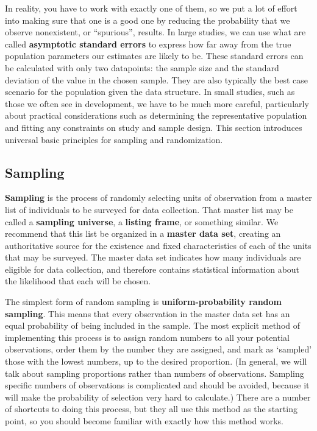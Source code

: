 In reality, you have to work with exactly one of them,
so we put a lot of effort into making sure that one is a good one
by reducing the probability that we observe nonexistent, or ``spurious'', results.
In large studies, we can use what are called \textbf{asymptotic standard errors}
to express how far away from the true population parameters our estimates are likely to be.
These standard errors can be calculated with only two datapoints:
the sample size and the standard deviation of the value in the chosen sample.
They are also typically the best case scenario for the population given the data structure.
In small studies, such as those we often see in development,
we have to be much more careful, particularly about practical considerations
such as determining the representative population
and fitting any constraints on study and sample design.
This section introduces universal basic principles for sampling and randomization.

\subsection{Sampling}

\textbf{Sampling} is the process of randomly selecting units of observation
from a master list of individuals to be surveyed for data collection.
That master list may be called a \textbf{sampling universe}, a \textbf{listing frame}, or something similar.
We recommend that this list be organized in a \textbf{master data set},
creating an authoritative source for the existence and fixed 
characteristics of each of the units that may be surveyed.
The master data set indicates how many individuals are eligible for data collection,
and therefore contains statistical information about the likelihood that each will be chosen.

The simplest form of random sampling is \textbf{uniform-probability random sampling}.
This means that every observation in the master data set
has an equal probability of being included in the sample.
The most explicit method of implementing this process
is to assign random numbers to all your potential observations,
order them by the number they are assigned,
and mark as `sampled' those with the lowest numbers, up to the desired proportion.
(In general, we will talk about sampling proportions rather than numbers of observations.
Sampling specific numbers of observations is complicated and should be avoided,
because it will make the probability of selection very hard to calculate.)
There are a number of shortcuts to doing this process,
but they all use this method as the starting point,
so you should become familiar with exactly how this method works.

